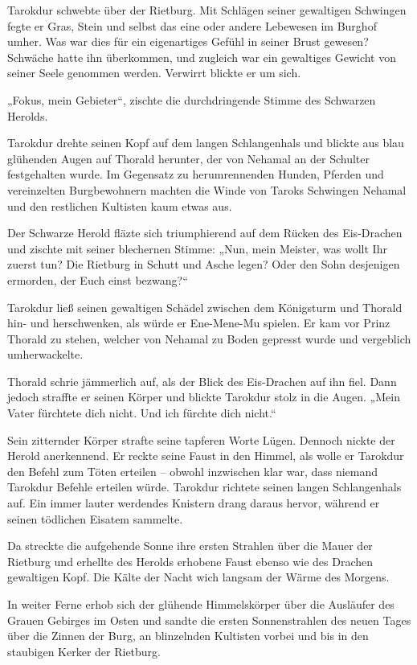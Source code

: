 Tarokdur schwebte über der Rietburg. Mit Schlägen seiner gewaltigen Schwingen fegte er Gras, Stein und selbst das eine oder andere Lebewesen im Burghof umher. Was war dies für ein eigenartiges Gefühl in seiner Brust gewesen? Schwäche hatte ihn überkommen, und zugleich war ein gewaltiges Gewicht von seiner Seele genommen werden. Verwirrt blickte er um sich.

„Fokus, mein Gebieter“, zischte die durchdringende Stimme des Schwarzen Herolds.

Tarokdur drehte seinen Kopf auf dem langen Schlangenhals und blickte aus blau glühenden Augen auf Thorald herunter, der von Nehamal an der Schulter festgehalten wurde. Im Gegensatz zu herumrennenden Hunden, Pferden und vereinzelten Burgbewohnern machten die Winde von Taroks Schwingen Nehamal und den restlichen Kultisten kaum etwas aus.

Der Schwarze Herold fläzte sich triumphierend auf dem Rücken des Eis-Drachen und zischte mit seiner blechernen Stimme: „Nun, mein Meister, was wollt Ihr zuerst tun? Die Rietburg in Schutt und Asche legen? Oder den Sohn desjenigen ermorden, der Euch einst bezwang?“

Tarokdur ließ seinen gewaltigen Schädel zwischen dem Königsturm und Thorald hin- und herschwenken, als würde er Ene-Mene-Mu spielen. Er kam vor Prinz Thorald zu stehen, welcher von Nehamal zu Boden gepresst wurde und vergeblich umherwackelte.

Thorald schrie jämmerlich auf, als der Blick des Eis-Drachen auf ihn fiel. Dann jedoch straffte er seinen Körper und blickte Tarokdur stolz in die Augen. „Mein Vater fürchtete dich nicht. Und ich fürchte dich nicht.“

Sein zitternder Körper strafte seine tapferen Worte Lügen. Dennoch nickte der Herold anerkennend. Er reckte seine Faust in den Himmel, als wolle er Tarokdur den Befehl zum Töten erteilen – obwohl inzwischen klar war, dass niemand Tarokdur Befehle erteilen würde. Tarokdur richtete seinen langen Schlangenhals auf. Ein immer lauter werdendes Knistern drang daraus hervor, während er seinen tödlichen Eisatem sammelte.

Da streckte die aufgehende Sonne ihre ersten Strahlen über die Mauer der Rietburg und erhellte des Herolds erhobene Faust ebenso wie des Drachen gewaltigen Kopf. Die Kälte der Nacht wich langsam der Wärme des Morgens.

In weiter Ferne erhob sich der glühende Himmelskörper über die Ausläufer des Grauen Gebirges im Osten und sandte die ersten Sonnenstrahlen des neuen Tages über die Zinnen der Burg, an blinzelnden Kultisten vorbei und bis in den staubigen Kerker der Rietburg.

